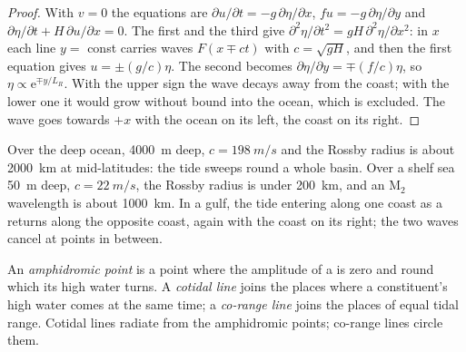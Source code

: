 \begin{proof}
With $v = 0$ the equations are $\partial u/\partial t = -g\,\partial\eta/
\partial x$, $fu = -g\,\partial\eta/\partial y$ and $\partial\eta/\partial t
+ H\,\partial u/\partial x = 0$. The first and the third give $\partial^2
\eta/\partial t^2 = gH\,\partial^2\eta/\partial x^2$: in $x$ each line
$y = $ const carries waves $F(x \mp ct)$ with $c = \sqrt{gH}$, and then the
first equation gives $u = \pm(g/c)\eta$. The second becomes $\partial\eta/
\partial y = \mp(f/c)\eta$, so $\eta \propto \mathrm e^{\mp y/L_R}$. With
the upper sign the wave decays away from the coast; with the lower one it
would grow without bound into the ocean, which is excluded. The wave goes
towards $+x$ with the ocean on its left, the coast on its right.
\end{proof}

Over the deep ocean, \qty{4000}{m} deep, $c = \qty{198}{m/s}$ and the
Rossby radius is about \qty{2000}{km} at mid-latitudes: the tide sweeps
round a whole basin. Over a shelf sea \qty{50}{m} deep, $c =
\qty{22}{m/s}$, the Rossby radius is under \qty{200}{km}, and an M$_2$
wavelength is about \qty{1000}{km}. In a gulf, the tide entering along one
coast as a  returns along the opposite coast, again with the
coast on its right; the two waves cancel at points in between.

\begin{definition}\label{def:b3:ocean-dynamics:amphidrome}
An \emph{amphidromic point} is a point where the
amplitude of a  is zero and round which its high water
turns. A \emph{cotidal line} joins the places where a
constituent's high water comes at the same time; a \emph{co-range
line} joins the places of equal tidal range. Cotidal
lines radiate from the amphidromic points; co-range lines circle them.
\end{definition}

